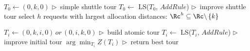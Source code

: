 	\begin{algorithmic}[1]
			\State $T_0 \leftarrow (0,k,0)$ {\hfill \small \hspace{.6cm}$\triangleright \,$ simple shuttle tour}
			\State $T_0 \leftarrow$ \textsc{LS($T_0$, $AddRule$)}   {\hfill \small \hspace{.6cm}$\triangleright \,$ improve shuttle tour}
			\State select $h$ requests with largest allocation distances: $\Rc^{h} \subseteq \Rc\backslash\left\lbrace k\right\rbrace$
	
				\State $T_i \leftarrow (0,k,i,0)\,or\,(0,i,k,0)$ {\hfill \small \hspace{.6cm}$\triangleright \,$ build atomic tour}
				\State $T_i \leftarrow$ \textsc{LS($T_i$, $AddRule$)}   {\hfill \small \hspace{.6cm}$\triangleright \,$ improve initial tour}
			\EndFor
			\State 	\Return $\arg\min_{T_i} Z(T_i)$	{\hfill \small \hspace{.6cm}$\triangleright \,$ return best tour }
		\EndProcedure
	\end{algorithmic}

